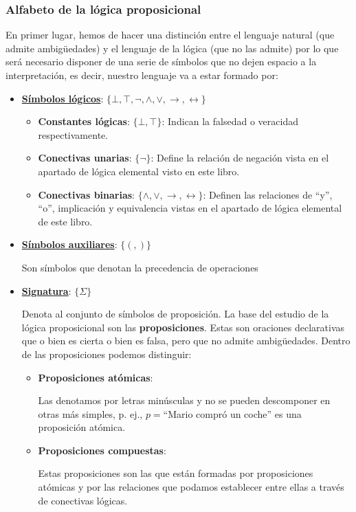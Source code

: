 \documentclass[10pt,a4paper,openright]{book}
\begin{document}
\subsubsection*{Alfabeto de la lógica proposicional}
En primer lugar, hemos de hacer una distinción entre el lenguaje natural (que admite ambigüedades) y el lenguaje de la lógica (que no las admite) por lo que será necesario disponer de una serie de símbolos que no dejen espacio a la interpretación, es decir, nuestro lenguaje va a estar formado por:
\begin{itemize}
\item \underline{\textbf{Símbolos lógicos}}: $\{\bot, \top, \neg, \wedge, \vee, \rightarrow, \leftrightarrow \}$
	\begin{itemize}
	\item \textbf{Constantes lógicas}: $\{\bot, \top\}$: Indican la falsedad o veracidad respectivamente.
	
	\item \textbf{Conectivas unarias}: $\{\neg\}$: Define la relación de negación vista en el apartado de lógica elemental visto en este libro.
	
	\item \textbf{Conectivas binarias}: $\{\wedge, \vee, \rightarrow, \leftrightarrow\}$:	Definen las relaciones de ``y'', ``o'', implicación y equivalencia vistas en el apartado de lógica elemental de este libro.
	\end{itemize}
\item \underline{\textbf{Símbolos auxiliares}}: $\{(,)\}$

Son símbolos que denotan la precedencia de operaciones

\item \underline{\textbf{Signatura}}: $\{\Sigma\}$

Denota al conjunto de símbolos de proposición. La base del estudio de la lógica proposicional son las \textbf{proposiciones}. Estas son oraciones declarativas que o bien es cierta o bien es falsa, pero que no admite ambigüedades. Dentro de las proposiciones podemos distinguir:
	\begin{itemize}
	\item \textbf{Proposiciones atómicas}:

	Las denotamos por letras minúsculas y no se pueden descomponer en otras 	más simples, p. ej., $p =$``Mario compró un coche'' es una proposición 	atómica.

	\item \textbf{Proposiciones compuestas}:

	Estas proposiciones son las que están formadas por proposiciones atómicas y por las relaciones que podamos establecer entre ellas a través de conectivas lógicas.
	\end{itemize}
\end{itemize}
\end{document}
